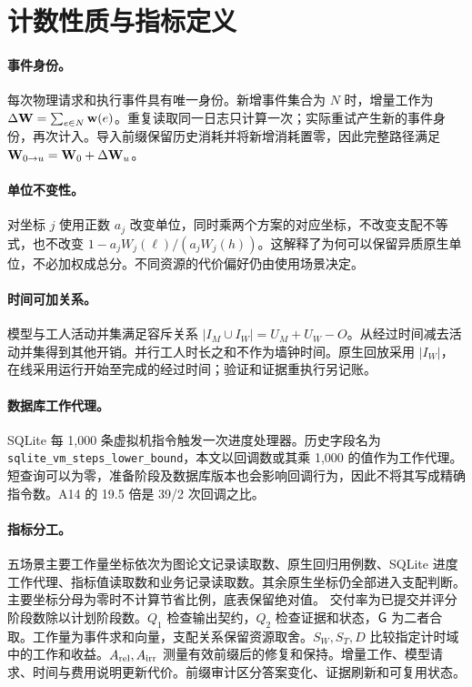 \section{计数性质与指标定义}
\paragraph{事件身份。}
每次物理请求和执行事件具有唯一身份。新增事件集合为 $N$ 时，增量工作为 $\Delta\mathbf{W}=\sum_{e\in N}\mathbf w(e)$。重复读取同一日志只计算一次；实际重试产生新的事件身份，再次计入。导入前缀保留历史消耗并将新增消耗置零，因此完整路径满足 $\mathbf{W}_{0\rightarrow u}=\mathbf{W}_0+\Delta\mathbf{W}_u$。

\paragraph{单位不变性。}
对坐标 $j$ 使用正数 $a_j$ 改变单位，同时乘两个方案的对应坐标，不改变支配不等式，也不改变 $1-a_jW_j(\ell)/(a_jW_j(h))$。这解释了为何可以保留异质原生单位，不必加权成总分。不同资源的代价偏好仍由使用场景决定。

\paragraph{时间可加关系。}
模型与工人活动并集满足容斥关系 $|I_M\cup I_W|=U_M+U_W-O$。从经过时间减去活动并集得到其他开销。并行工人时长之和不作为墙钟时间。原生回放采用 $|I_W|$，在线采用运行开始至完成的经过时间；验证和证据重执行另记账。

\paragraph{数据库工作代理。}
SQLite 每 1,000 条虚拟机指令触发一次进度处理器。历史字段名为 \nolinkurl{sqlite_vm_steps_lower_bound}，本文以回调数或其乘 1,000 的值作为工作代理。短查询可以为零，准备阶段及数据库版本也会影响回调行为，因此不将其写成精确指令数。A14 的 19.5 倍是 39/2 次回调之比。

\paragraph{指标分工。}
五场景主要工作量坐标依次为图论文记录读取数、原生回归用例数、SQLite 进度工作代理、指标值读取数和业务记录读取数。其余原生坐标仍全部进入支配判断。主要坐标分母为零时不计算节省比例，底表保留绝对值。
交付率为已提交并评分阶段数除以计划阶段数。$Q_1$ 检查输出契约，$Q_2$ 检查证据和状态，$\mathsf{G}$ 为二者合取。工作量为事件求和向量，支配关系保留资源取舍。$S_W,S_T,D$ 比较指定计时域中的工作和收益。$A_{\rm rel},A_{\rm irr}$ 测量有效前缀后的修复和保持。增量工作、模型请求、时间与费用说明更新代价。前缀审计区分答案变化、证据刷新和可复用状态。

